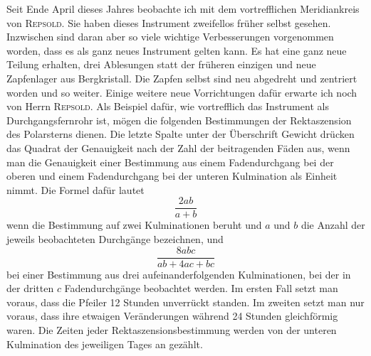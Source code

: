 \par\indent Seit Ende April dieses Jahres beobachte ich mit dem vortrefflichen Meridiankreis von \textsc{Repsold}. Sie haben dieses Instrument zweifellos früher selbst gesehen. Inzwischen sind daran aber so viele wichtige Verbesserungen vorgenommen worden, dass es als ganz neues Instrument gelten kann. Es hat eine ganz neue Teilung erhalten, drei Ablesungen statt der früheren einzigen und neue Zapfenlager aus Bergkristall. Die Zapfen selbst sind neu abgedreht und zentriert worden und so weiter. Einige weitere neue Vorrichtungen dafür erwarte ich noch von Herrn \textsc{Repsold}. Als Beispiel dafür, wie vortrefflich das Instrument als Durchgangsfernrohr ist, mögen die folgenden Bestimmungen der Rektaszension des Polarsterns dienen. Die letzte Spalte unter der Überschrift Gewicht drücken das Quadrat der Genauigkeit nach der Zahl der beitragenden Fäden aus, wenn man die Genauigkeit einer Bestimmung aus einem Fadendurchgang bei der oberen und einem Fadendurchgang bei der unteren Kulmination als Einheit nimmt. Die Formel dafür lautet
\[
\frac{2ab}{a+b}
\]
\noindent wenn die Bestimmung auf zwei Kulminationen beruht und $a$ und $b$ die Anzahl der jeweils beobachteten Durchgänge bezeichnen, und
\[
\frac{8abc}{ab+4ac+bc}
\]
\noindent bei einer Bestimmung aus drei aufeinanderfolgenden Kulminationen, bei der in der dritten $c$ Fadendurchgänge beobachtet werden. Im ersten Fall setzt man voraus, dass die Pfeiler 12 Stunden unverrückt standen. Im zweiten setzt man nur voraus, dass ihre etwaigen Veränderungen während 24 Stunden gleichförmig waren. Die Zeiten jeder Rektaszensionsbestimmung werden von der unteren Kulmination des jeweiligen Tages an gezählt.

